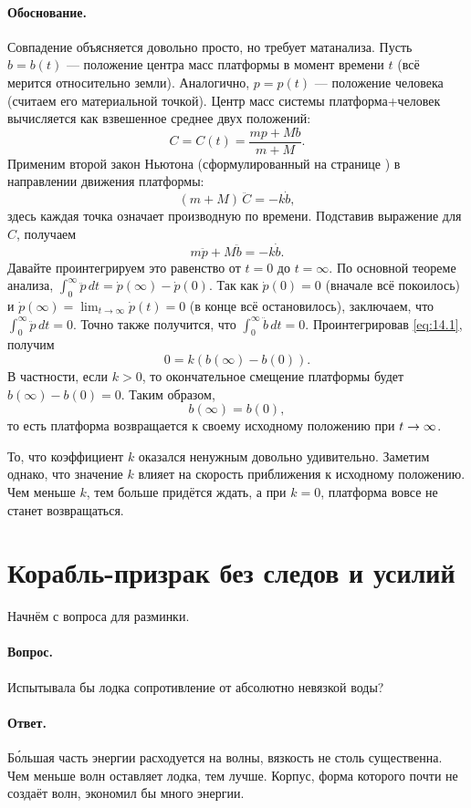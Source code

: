 \paragraph{Обоснование.}
Совпадение объясняется довольно просто, но требует матанализа.
Пусть $b = b(t)$ --- положение центра масс платформы в момент времени $t$ (всё мерится относительно земли).
Аналогично, $p = p(t)$ --- положение человека
(считаем его материальной точкой).
Центр масс системы платформа+человек вычисляется как взвешенное среднее двух положений:
\[C = C(t) = \frac{m p + M b}{m + M}.\]
Применим второй закон Ньютона (сформулированный на странице \pageref{Законы Ньютона}) в направлении движения платформы:
\[(m+M)\,\ddot{C} = -k \dot{b},\]
здесь каждая точка означает производную по времени.
Подставив выражение для $C$, получаем
\begin{equation}
m \ddot{p} + M \ddot{b} = -k \dot{b}.
\label{eq:14.1}
\end{equation}
Давайте проинтегрируем это равенство от $t=0$ до $t=\infty$.
По основной теореме анализа,
$\int_0^\infty \ddot{p}\,dt = \dot{p}(\infty) - \dot{p}(0)$.
Так как $\dot{p}(0)=0$ (вначале всё покоилось) и
$\dot{p}(\infty)=\lim_{t\to\infty}\dot{p}(t)=0$ (в конце всё остановилось),
заключаем, что
$\int_0^\infty \ddot{p}\,dt=0$.
Точно также получится, что
$\int_0^\infty \ddot{b}\,dt = 0$.
Проинтегрировав \eqref{eq:14.1}, получим
\[0= k(b(\infty) - b(0)).\]
В частности, если $k > 0$, то окончательное смещение платформы будет $b(\infty) - b(0) = 0$.
Таким образом,
\[
b(\infty) = b(0),
\]
то есть платформа возвращается к своему исходному положению при $t\z\to\infty$.

То, что коэффициент $k$ оказался ненужным довольно удивительно.
Заметим однако, что значение $k$ влияет на скорость
приближения к исходному положению.
Чем меньше $k$, тем больше придётся ждать, а при $k = 0$, платформа вовсе не станет возвращаться.

\section{Корабль-призрак без следов и усилий}

Начнём с вопроса для разминки.

\paragraph{Вопрос.}
Испытывала бы лодка сопротивление от абсолютно невязкой воды?

\paragraph{Ответ.}
Б\'{о}льшая часть энергии расходуется на волны, вязкость не столь существенна.
Чем меньше волн оставляет лодка, тем лучше.
Корпус, форма которого почти не создаёт волн, экономил бы много энергии.

